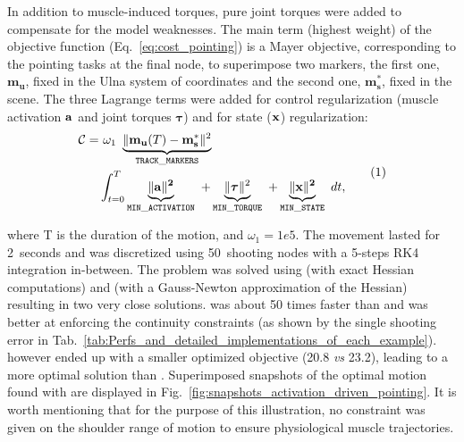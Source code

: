 In addition to muscle-induced torques, pure joint torques were added to compensate for the model weaknesses.
The main term (highest weight) of the objective function (Eq.~\ref{eq:cost_pointing}) is a Mayer objective, corresponding to the pointing tasks at the final node, to superimpose two markers, the first one, $\mathbf{m_u}$, fixed in the Ulna system of coordinates and the second one, $\mathbf{m^*_s}$, fixed in the scene.
The three Lagrange terms  were added for control regularization (muscle activation $\bf{a}$ and joint torques $\boldsymbol{\tau}$) and for state ($\bf{x}$) regularization:
\[
\begin{aligned}
	\mathcal{C} = 	&~\omega_1~\underbrace{\|\mathbf{m_u}(T)-\mathbf{m^*_s}\|^2}_{\mathtt{TRACK\_MARKERS}}~\\
	&\int_{t=0}^T\underbrace{\|\bf{a}\|^2}_{\mathtt{MIN\_ACTIVATION}}~
	+\underbrace{\|\boldsymbol\tau\|^2}_{\mathtt{MIN\_TORQUE}}~
	+\underbrace{\|\bf{x}\|^2}_{\mathtt{MIN\_STATE}}~ dt,
\end{aligned}
\addtag
\label{eq:cost_pointing}
\]

\noindent where T is the duration of the motion, and $\omega_1=1e5$.
The movement lasted for 2~seconds and was discretized using 50~shooting nodes with a 5-steps RK4 integration in-between.
The problem was solved using \ipopt (with exact Hessian computations) and \acados (with a Gauss-Newton approximation of the Hessian) resulting in two very close solutions.
\acados was about 50 times faster than \ipopt and was better at enforcing the continuity constraints (as shown by the single shooting error in Tab.~\ref{tab:Perfs_and_detailed_implementations_of_each_example}).
\ipopt however ended up with a smaller optimized objective (20.8 \textit{vs} 23.2), leading to a more optimal solution than \acados. 
Superimposed snapshots of the optimal motion found with \acados are displayed in Fig.~\ref{fig:snapshots_activation_driven_pointing}.
It is worth mentioning that for the purpose of this illustration, no constraint was given on the shoulder range of motion to ensure physiological muscle trajectories. 








